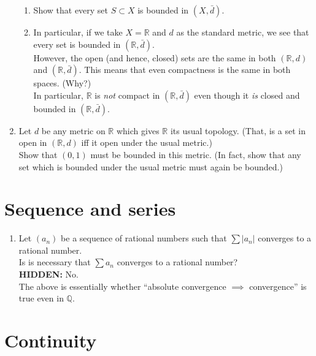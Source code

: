 \documentclass[12pt]{article}
\theoremstyle{definition}
\numberwithin{thm}{section}
\newcommand{\hint}[1]{\textbf{HIDDEN:} {\color[rgb]{0.95, 0.95, 0.95}#1}}
\begin{document}
\begin{enumerate}
\begin{enumerate}
		\item Show that every set $S \subset X$ is bounded in $(X, \bar{d}).$
		\item In particular, if we take $X = \mathbb{R}$ and $d$ as the standard metric, we see that every set is bounded in $(\mathbb{R}, \bar{d}).$\\
		However, the open (and hence, closed) sets are the same in both $(\mathbb{R}, d)$ and $(\mathbb{R}, \bar{d}).$ This means that even compactness is the same in both spaces. (Why?)\\
		In particular, $\mathbb{R}$ is \emph{not} compact in $(\mathbb{R}, \bar{d})$ even though it \emph{is} closed and bounded in $(\mathbb{R}, \bar{d}).$
	\end{enumerate}
	\item Let $d$ be any metric on $\mathbb{R}$ which gives $\mathbb{R}$ its usual topology. (That, is a set in open in $(\mathbb{R}, d)$ iff it open under the usual metric.)\\
	Show that $(0, 1)$ must be bounded in this metric. (In fact, show that any set which is bounded under the usual metric must again be bounded.)
\end{enumerate}
\newpage\section{Sequence and series}
\begin{enumerate}
	\item Let $(a_n)$ be a sequence of rational numbers such that $\sum |a_n|$ converges to a rational number.\\
	Is is necessary that $\sum a_n$ converges to a rational number?\\
	\hint{No.}\\
	The above is essentially whether ``absolute convergence $\implies$ convergence'' is true even in $\mathbb{Q}.$
\end{enumerate}
\newpage\section{Continuity}
\end{document}
